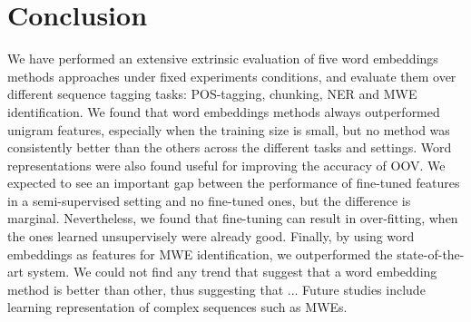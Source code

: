 \section{Conclusion}
We have performed an extensive extrinsic evaluation of five word embeddings methods approaches
under fixed experiments conditions, and evaluate them over different sequence tagging tasks: POS-tagging, chunking, NER and MWE identification.
We found that word embeddings methods always outperformed unigram features, especially when the training size is small, but no method was consistently better than the others across the different tasks and settings.
Word representations were also found useful for improving the accuracy of OOV.
We expected to see an important gap between the performance of fine-tuned features in a semi-supervised setting and no fine-tuned ones, but the difference is marginal.
Nevertheless, we found that fine-tuning can result in over-fitting, when the ones learned  unsupervisely were already good.   
Finally, by using word embeddings as features for MWE identification, we outperformed 
the state-of-the-art system.
We could not find any trend that suggest that a word embedding method is better than other, 
thus suggesting that ...
Future studies include learning representation of complex sequences such as MWEs. 


